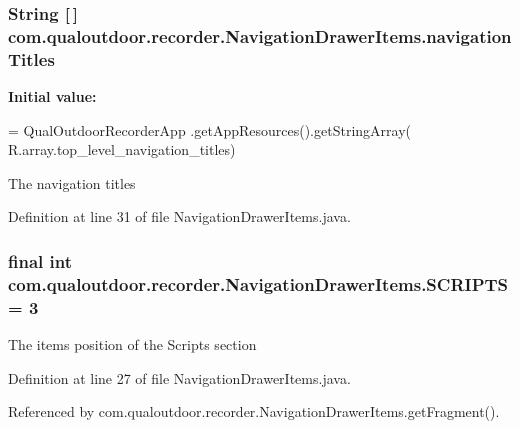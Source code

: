 \hypertarget{classcom_1_1qualoutdoor_1_1recorder_1_1NavigationDrawerItems_a5d17ce61823c857dc351d1ff0a44b264}{
\subsubsection[{navigation\-Titles}]{\setlength{\rightskip}{0pt plus 5cm}String \mbox{[}$\,$\mbox{]} com.\-qualoutdoor.\-recorder.\-Navigation\-Drawer\-Items.\-navigation\-Titles\hspace{0.3cm}{\ttfamily [static]}}}\label{classcom_1_1qualoutdoor_1_1recorder_1_1NavigationDrawerItems_a5d17ce61823c857dc351d1ff0a44b264}
{\bfseries Initial value\-:}
\begin{DoxyCode}
= QualOutdoorRecorderApp
            .getAppResources().getStringArray(
                    R.array.top\_level\_navigation\_titles)
\end{DoxyCode}
The navigation titles 

Definition at line 31 of file Navigation\-Drawer\-Items.\-java.

\hypertarget{classcom_1_1qualoutdoor_1_1recorder_1_1NavigationDrawerItems_a3a0cf69b1f37ef4ef62788a5c9f768fd}{
\subsubsection[{S\-C\-R\-I\-P\-T\-S}]{\setlength{\rightskip}{0pt plus 5cm}final int com.\-qualoutdoor.\-recorder.\-Navigation\-Drawer\-Items.\-S\-C\-R\-I\-P\-T\-S = 3\hspace{0.3cm}{\ttfamily [static]}}}\label{classcom_1_1qualoutdoor_1_1recorder_1_1NavigationDrawerItems_a3a0cf69b1f37ef4ef62788a5c9f768fd}
The items position of the Scripts section 

Definition at line 27 of file Navigation\-Drawer\-Items.\-java.



Referenced by com.\-qualoutdoor.\-recorder.\-Navigation\-Drawer\-Items.\-get\-Fragment().

